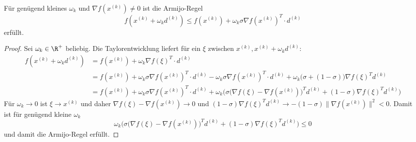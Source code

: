\documentclass[11pt]{scrbook}
\begin{document}
\begin{lem} \label{4.7}
	Für genügend kleines $\omega_k$ und $\nabla f(x^{(k)}) \neq 0$ ist die Armijo-Regel
	\[
		f(x^{(k)} + \omega_k d^{(k)}) \le f(x^{(k)}) + \omega_k \sigma \nabla f(x^{(k)})^T \cdot d^{(k)}
	\]
	erfüllt.
	\begin{proof}
		Sei $\omega_k \in \R^+$ beliebig.
		Die Taylorentwicklung liefert für ein $\xi$ zwischen $x^{(k)}, x^{(k)} + \omega_k d^{(k)}$:
		\begin{align*}
			f(x^{(k)}+ \omega_k d^{(k)}) &= f(x^{(k)}) + \omega_k \nabla f(\xi)^T \cdot d^{(k)} \\
			&= f(x^{(k)}) + \omega_k \sigma \nabla f(x^{(k)})^T \cdot d^{(k)} - \omega_k \sigma \nabla f(x^{(k)})^T \cdot d^{(k)} + \omega_k \Big(\sigma + (1- \sigma)\Big) \nabla f(\xi)^T d^{(k)}\\
			&= f(x^{(k)}) + \omega_k \sigma \nabla f(x^{(k)})^T \cdot d^{(k)}
			+ \omega_k \bigg(\sigma \Big(\nabla f(\xi) - \nabla f(x^{(k)})\Big)^T d^{(k)} + (1-\sigma)\nabla f(\xi)^T d^{(k)} \bigg)
		\end{align*}
		Für $\omega_k \to 0$ ist $\xi \to x^{(k)}$ und daher $\nabla f(\xi) - \nabla f(x^{(k)}) \to 0$ und $(1-\sigma) \nabla f(\xi)^T d^{(k)} \to -(1-\sigma)\|\nabla f(x^{(k)})\|^2 < 0$.
		Damit ist für genügend kleine $\omega_k$
		\[
			\omega_k \bigg(\sigma \Big(\nabla f(\xi) - \nabla f(x^{(k)})\Big)^T d^{(k)} + (1-\sigma)\nabla f(\xi)^T d^{(k)} \bigg) \le 0
		\]
		und damit die Armijo-Regel erfüllt.
	\end{proof}
\end{lem}
\end{document}
